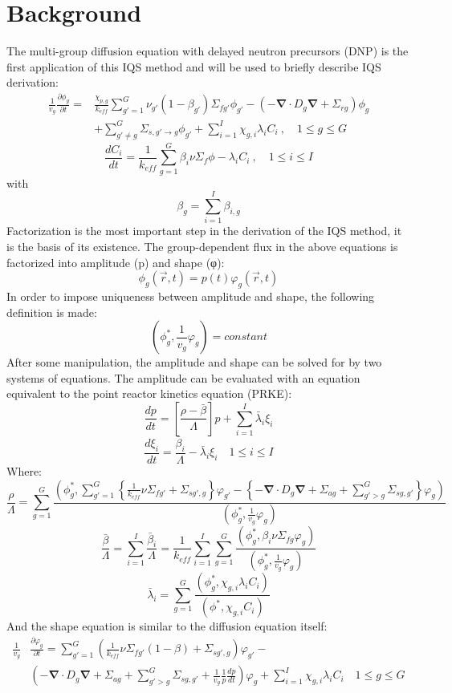 \documentclass[11pt]{scrartcl}
\renewcommand{\div}{\bs{\nabla}\! \cdot \!}
\newcommand{\grad}{\bs{\nabla}}
\newcommand{\bs}[1]{\mathbf{#1}}
\newcommand{\keff}{k_\textit{eff}}
\newcommand{\be}{\begin{equation}}
\newcommand{\ee}{\end{equation}}
\begin{document}
\section{Background}
The multi-group diffusion equation with delayed neutron precursors (DNP) is the first application of this IQS method and will be used to briefly describe IQS derivation:
\begin{align}
\frac{1}{v_g} \frac{\partial \phi_g }{\partial t} =& 
\frac{\chi_{p,g}}{\keff} \sum_{g'=1}^G \nu_{g'}(1-\beta_{g'}) \Sigma_{fg'} \phi_{g'} 
-  \left( -\div D_g \grad  + \Sigma_{rg} \right) \phi_g  \nonumber \\
&  + \sum_{g'\neq g}^G\Sigma_{s,g'\to g} \phi_{g'}  + \sum_{i=1}^I\chi_{g,i}\lambda_i C_i \ , \quad 1 \le g \le G 
\end{align}
\be
\frac{dC_i}{dt} = \frac{1}{k_{eff}}\sum_{g=1}^G\beta_i\nu \Sigma_f \phi - \lambda_i C_i \ , \quad 1 \le i \le I 
\ee
with
\be
\beta_g = \sum_{i=1}^I \beta_{i,g} 
\ee
Factorization is the most important step in the derivation of the IQS method, it is the basis of its existence.  The group-dependent flux in the above equations is factorized into amplitude (p) and shape (φ):
\be
\phi_g(\vec{r},t)=p(t)\varphi_g(\vec{r},t)
\ee
In order to impose uniqueness between amplitude and shape, the following definition is made:
\be
\left(\phi_g^*,\frac{1}{v_g}\varphi_g\right)=constant
\ee
After some manipulation, the amplitude and shape can be solved for by two systems of equations.  The amplitude can be evaluated with an equation equivalent to the point reactor kinetics equation (PRKE):
\be
\frac{dp}{dt}=\left[\frac{\rho-\bar{\beta}}{\Lambda}\right]p+\sum_{i=1}^I\bar{\lambda}_i\xi_i
\ee
\be
\frac{d\xi_i}{dt}=\frac{\bar{\beta}_i}{\Lambda}-\bar{\lambda}_i\xi_i \quad 1 \le i \le I 
\ee
Where:
\be
\frac{\rho}{\Lambda}=\sum_{g=1}^G\frac{ \left(\phi_g^*,\sum_{g'=1}^G\left\{\frac{1}{k_{eff}} \nu \Sigma_{fg'}+\Sigma_{sg',g}\right\}\varphi_{g'} -\left\{ -\div D_g \grad+\Sigma_{ag}+\sum_{g'>g}^G\Sigma_{sg,g'}\right\}\varphi_g\right)}{\left(\phi_g^*,\frac{1}{v_g}\varphi_g\right)}
\ee
\be
\frac{\bar{\beta}}{\Lambda}=\sum_{i=1}^I\frac{\bar{\beta}_i}{\Lambda}=\frac{1}{k_{eff}}\sum_{i=1}^I\sum_{g=1}^G\frac{(\phi_g^*,\beta_i\nu\Sigma_{fg}\varphi_g)}{\left(\phi_g^*,\frac{1}{v_g}\varphi_g\right)}
\ee
\be
\bar{\lambda}_i=\sum_{g=1}^G\frac{(\phi_g^*,\chi_{g,i}\lambda_iC_i)}{(\phi^*,\chi_{g,i}C_i)}
\ee
And the shape equation is similar to the diffusion equation itself:
\begin{align}
\frac{1}{v_g}& \frac{\partial \varphi_g }{\partial t} = \sum_{g'=1}^G\left(\frac{1}{k_{eff}}\nu \Sigma_{fg'}(1-\beta)+\Sigma_{sg',g}\right) \varphi_{g'} - \nonumber \\
& \left( -\div D_g \grad  + \Sigma_{ag}  + \sum_{g'>g}^G\Sigma_{sg,g'} + \frac{1}{v_g}\frac{1}{p}\frac{dp}{dt} \right)\varphi_g + \sum_{i=1}^I\chi_{g,i}\lambda_i C_i \quad 1 \le g \le G 
\label{eq:shape}
\end{align}
\end{document}
